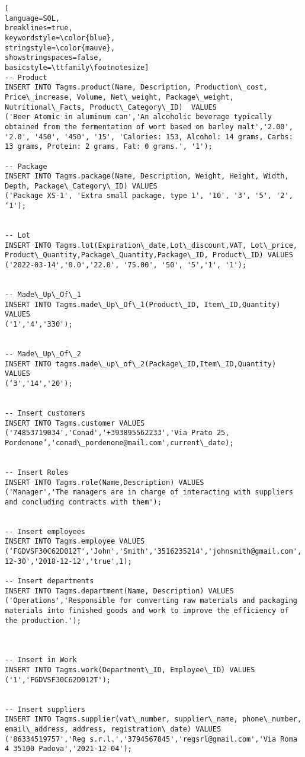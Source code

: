 \begin{lstlisting}[
language=SQL,
breaklines=true,
keywordstyle=\color{blue},
stringstyle=\color{mauve},
showstringspaces=false,
basicstyle=\ttfamily\footnotesize]
-- Product
INSERT INTO Tagms.product(Name, Description, Production\_cost, Price\_increase, Volume, Net\_weight, Package\_weight, Nutritional\_Facts, Product\_Category\_ID)  VALUES
('Beer Atomic in aluminum can','An alcoholic beverage typically obtained from the fermentation of wort based on barley malt','2.00', '2.0', '450', '450', '15', 'Calories: 153, Alcohol: 14 grams, Carbs: 13 grams, Protein: 2 grams, Fat: 0 grams.', '1');

-- Package
INSERT INTO Tagms.package(Name, Description, Weight, Height, Width, Depth, Package\_Category\_ID) VALUES
('Package XS-1', 'Extra small package, type 1', '10', '3', '5', '2', ‘1');


-- Lot
INSERT INTO Tagms.lot(Expiration\_date,Lot\_discount,VAT, Lot\_price, Product\_Quantity,Package\_Quantity,Package\_ID, Product\_ID) VALUES
('2022-03-14','0.0','22.0', '75.00', '50', '5','1', '1');


-- Made\_Up\_Of\_1
INSERT INTO Tagms.made\_Up\_Of\_1(Product\_ID, Item\_ID,Quantity) VALUES
('1','4','330');


-- Made\_Up\_Of\_2
INSERT INTO tagms.made\_up\_of\_2(Package\_ID,Item\_ID,Quantity) VALUES
(‘3','14','20');									


-- Insert customers
INSERT INTO Tagms.customer VALUES
('74853719034','Conad','+393895562233','Via Prato 25, Pordenone’,'conad\_pordenone@mail.com',current\_date);


-- Insert Roles
INSERT INTO Tagms.role(Name,Description) VALUES
('Manager','The managers are in charge of interacting with suppliers and concluding contracts with them');


-- Insert employees
INSERT INTO Tagms.employee VALUES
(‘FGDVSF30C62D012T','John','Smith','3516235214','johnsmith@gmail.com','1995-12-30','2018-12-12','true',1);

-- Insert departments
INSERT INTO Tagms.department(Name, Description) VALUES
('Operations','Responsible for converting raw materials and packaging materials into finished goods and work to improve the efficiency of the production.');



-- Insert in Work
INSERT INTO Tagms.work(Department\_ID, Employee\_ID) VALUES
('1','FGDVSF30C62D012T');


-- Insert suppliers
INSERT INTO Tagms.supplier(vat\_number, supplier\_name, phone\_number, email\_address, address, registration\_date) VALUES
('86334519757','Reg s.r.l.','3794567845','regsrl@gmail.com','Via Roma 4 35100 Padova','2021-12-04');


\end{lstlisting}

